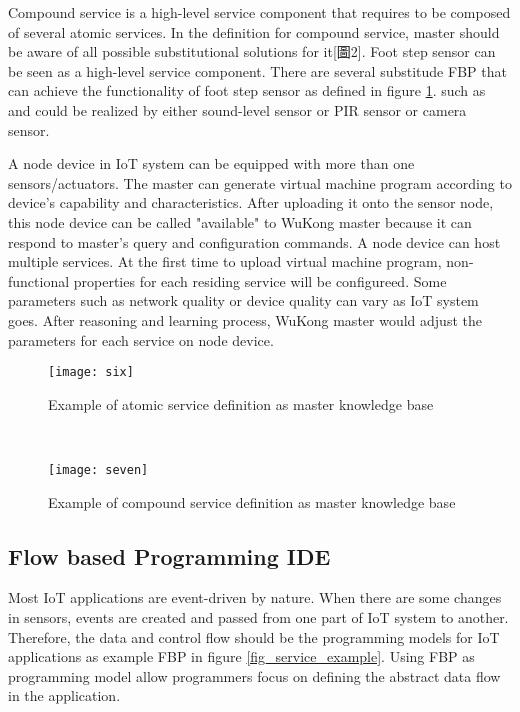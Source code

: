 Compound service is a high-level service component that requires to be composed of several atomic services. In the definition for compound service, master should be aware of all possible substitutional solutions for it[圖2]. Foot step sensor can be seen as a high-level service component. There are several substitude FBP that can achieve the functionality of foot step sensor as defined in figure \ref{fig:compound}. such as and could be realized by either sound-level sensor or PIR sensor or camera sensor. 

A node device in IoT system can be equipped with more than one sensors/actuators. The master can generate virtual machine program according to device's capability and characteristics. After uploading it onto the sensor node, this node device can be called "available" to WuKong master because it can respond to master's query and configuration commands. A node device can host multiple services. At the first time to upload virtual machine program, non-functional properties for each residing service will be configureed. Some parameters such as network quality or device quality can vary as IoT system goes. After reasoning and learning process, WuKong master would adjust the parameters for each service on node device. 

\begin{figure}[!t]
\centering
	\begin{minipage}[t]{1.0\linewidth}
        \centering
        \texttt{[image: six]}
        \caption{Example of atomic service definition as master knowledge base}\label{fig:atomic}
    \end{minipage}
    \\[0.2cm]
    \begin{minipage}[t]{1.0\linewidth}
        \centering
        \texttt{[image: seven]}
        \caption{Example of compound service definition as master knowledge base}\label{fig:compound}
    \end{minipage}
\end{figure}

\subsection{Flow based Programming IDE}

Most IoT applications are event-driven by nature. When there are some changes in sensors, events are created and passed from one part of IoT system to another. Therefore, the data and control flow should be the programming models for IoT applications as example FBP in figure \ref{fig_service_example}. Using FBP as programming model allow programmers focus on defining the abstract data flow in the application.  

